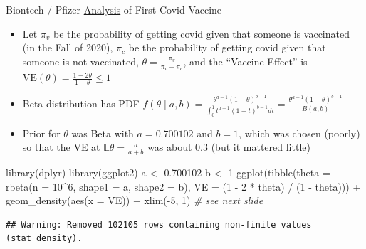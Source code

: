 \documentclass[
  ignorenonframetext,
]{beamer}
\newenvironment{Shaded}{\begin{snugshade}}{\end{snugshade}}
\newcommand{\AttributeTok}[1]{\textcolor[rgb]{0.77,0.63,0.00}{#1}}
\newcommand{\CommentTok}[1]{\textcolor[rgb]{0.56,0.35,0.01}{\textit{#1}}}
\newcommand{\DecValTok}[1]{\textcolor[rgb]{0.00,0.00,0.81}{#1}}
\newcommand{\FloatTok}[1]{\textcolor[rgb]{0.00,0.00,0.81}{#1}}
\newcommand{\FunctionTok}[1]{\textcolor[rgb]{0.00,0.00,0.00}{#1}}
\newcommand{\NormalTok}[1]{#1}
\newcommand{\OtherTok}[1]{\textcolor[rgb]{0.56,0.35,0.01}{#1}}
\newcommand{\SpecialCharTok}[1]{\textcolor[rgb]{0.00,0.00,0.00}{#1}}
\providecommand{\tightlist}{%
  \setlength{\itemsep}{0pt}\setlength{\parskip}{0pt}}
\begin{document}
\begin{frame}[fragile]{Biontech / Pfizer
\href{http://skranz.github.io//r/2020/11/11/CovidVaccineBayesian.html}{Analysis}
of First Covid Vaccine}
\protect\hypertarget{biontech-pfizer-analysis-of-first-covid-vaccine}{}
\begin{itemize}
\tightlist
\item
  Let \(\pi_v\) be the probability of getting covid given that someone
  is vaccinated (in the Fall of 2020), \(\pi_c\) be the probability of
  getting covid given that someone is not vaccinated,
  \(\theta = \frac{\pi_v}{\pi_v + \pi_c}\), and the ``Vaccine Effect''
  is
  \(\mbox{VE}\left(\theta\right) = \frac{1 - 2\theta}{1 - \theta} \leq 1\)
\item
  Beta distribution has PDF
  \(f\left(\theta \mid a,b\right) = \frac{\theta^{a - 1}\left(1 - \theta\right)^{b - 1}} {\int_0^1 t^{a - 1}\left(1 - t\right)^{b - 1}dt} = \frac{\theta^{a - 1}\left(1 - \theta\right)^{b - 1}}{B\left(a,b\right)}\)
\item
  Prior for \(\theta\) was Beta with \(a = 0.700102\) and \(b = 1\),
  which was chosen (poorly) so that the VE at
  \(\mathbb{E}\theta = \frac{a}{a + b}\) was about \(0.3\) (but it
  mattered little)
\end{itemize}

\begin{Shaded}
\begin{Highlighting}[]
\FunctionTok{library}\NormalTok{(dplyr)}
\FunctionTok{library}\NormalTok{(ggplot2)}
\NormalTok{a }\OtherTok{\textless{}{-}} \FloatTok{0.700102} 
\NormalTok{b }\OtherTok{\textless{}{-}} \DecValTok{1}
\FunctionTok{ggplot}\NormalTok{(}\FunctionTok{tibble}\NormalTok{(}\AttributeTok{theta =} \FunctionTok{rbeta}\NormalTok{(}\AttributeTok{n =} \DecValTok{10}\SpecialCharTok{\^{}}\DecValTok{6}\NormalTok{, }\AttributeTok{shape1 =}\NormalTok{ a, }\AttributeTok{shape2 =}\NormalTok{ b),}
              \AttributeTok{VE =}\NormalTok{ (}\DecValTok{1} \SpecialCharTok{{-}} \DecValTok{2} \SpecialCharTok{*}\NormalTok{ theta) }\SpecialCharTok{/}\NormalTok{ (}\DecValTok{1} \SpecialCharTok{{-}}\NormalTok{ theta))) }\SpecialCharTok{+} 
  \FunctionTok{geom\_density}\NormalTok{(}\FunctionTok{aes}\NormalTok{(}\AttributeTok{x =}\NormalTok{ VE)) }\SpecialCharTok{+} \FunctionTok{xlim}\NormalTok{(}\SpecialCharTok{{-}}\DecValTok{5}\NormalTok{, }\DecValTok{1}\NormalTok{) }\CommentTok{\# see next slide}
\end{Highlighting}
\end{Shaded}

\begin{verbatim}
## Warning: Removed 102105 rows containing non-finite values (stat_density).
\end{verbatim}
\end{frame}
\end{document}
